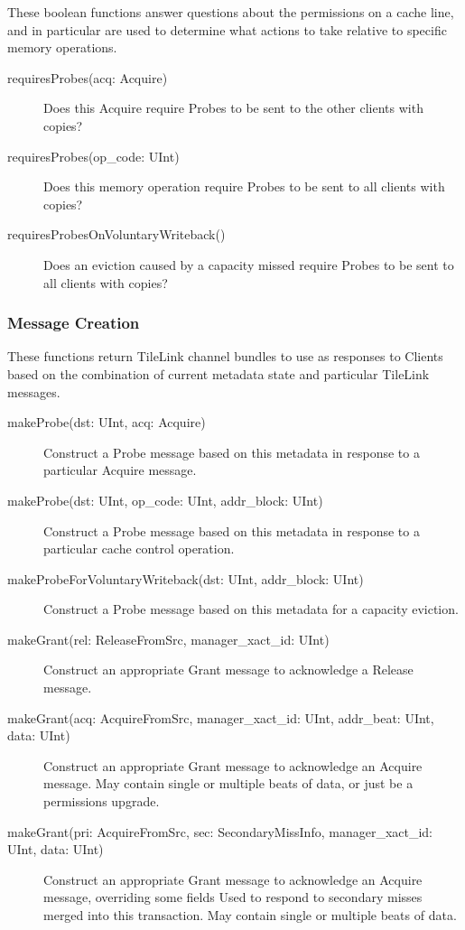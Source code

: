 These boolean functions answer questions about the permissions on a cache line, and in particular are used to determine what actions to take relative to specific memory operations.

\begin{description}
\item[requiresProbes(acq: Acquire) ]
Does this Acquire require Probes to be sent to the other clients with copies?
\item[requiresProbes(op\_code: UInt) ]
Does this memory operation require Probes to be sent to all clients with copies?
\item[requiresProbesOnVoluntaryWriteback() ]
 Does an eviction caused by a capacity missed require Probes to be sent to all clients with copies?
\end{description}

\subsubsection{Message Creation}

These functions return TileLink channel bundles to use as responses to Clients based on the combination of current metadata state and particular TileLink messages.

\begin{description}
\item[makeProbe(dst: UInt, acq: Acquire) ]
Construct a Probe message based on this metadata in response to a particular Acquire message.
\item[makeProbe(dst: UInt, op\_code: UInt, addr\_block: UInt) ]
Construct a Probe message  based on this metadata in response to a particular cache control operation.
\item[makeProbeForVoluntaryWriteback(dst: UInt, addr\_block: UInt) ]
Construct a Probe message based on this metadata for a capacity eviction.
\item[makeGrant(rel: ReleaseFromSrc, manager\_xact\_id: UInt) ]
Construct an appropriate Grant message to acknowledge a Release message.
\item[makeGrant(acq: AcquireFromSrc, manager\_xact\_id: UInt, addr\_beat: UInt, data: UInt) ]
Construct an appropriate Grant message to acknowledge an Acquire message.
May contain single or multiple beats of data, or just be a permissions upgrade.
\item[makeGrant(pri: AcquireFromSrc, sec: SecondaryMissInfo, manager\_xact\_id: UInt, data: UInt) ]
Construct an appropriate Grant message to acknowledge an Acquire message, overriding some fields
Used to respond to secondary misses merged into this transaction.
May contain single or multiple beats of data.
\end{description}

